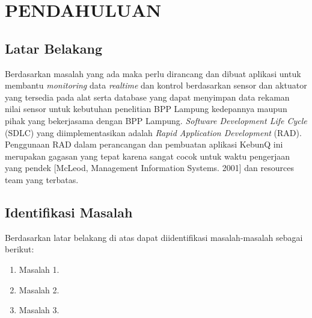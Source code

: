 \chapter{PENDAHULUAN}

\vspace{4.5pt}

\begin{flushleft}
    \section{Latar Belakang} 

\begin{justify}
  \noindent Berdasarkan masalah yang ada maka perlu dirancang dan dibuat aplikasi untuk membantu
\textit{monitoring} data \textit{realtime} dan kontrol berdasarkan sensor dan aktuator yang tersedia pada alat serta database yang dapat menyimpan data rekaman nilai sensor untuk kebutuhan
penelitian BPP Lampung kedepannya maupun pihak yang bekerjasama dengan BPP Lampung. \textit{Software Development Life Cycle} (SDLC) yang diimplementasikan adalah
\textit{Rapid Application Development} (RAD). Penggunaan RAD dalam perancangan dan pembuatan aplikasi KebunQ ini merupakan gagasan yang tepat karena sangat cocok untuk 
waktu pengerjaan yang pendek [McLeod, Management Information Systems. 2001] dan resources team yang terbatas.

\end{justify}
\vspace{1cm}   
\section{Identifikasi Masalah}

\begin{justify}
    Berdasarkan latar belakang di atas dapat diidentifikasi masalah-masalah sebagai berikut:
\begin{enumerate}[nolistsep,leftmargin=0.5cm]
\item Masalah 1.
\item Masalah 2.
\item Masalah 3.
\end{enumerate}

\end{justify}


\end{flushleft}







